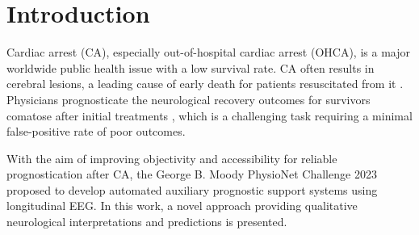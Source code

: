 \section{Introduction}
\label{sec:intro}


Cardiac arrest (CA), especially out-of-hospital cardiac arrest (OHCA), is a major worldwide public health issue with a low survival rate. CA often results in cerebral lesions, a leading cause of early death for patients resuscitated from it \cite{Benghanem_2022_Prog}. Physicians prognosticate the neurological recovery outcomes for survivors comatose after initial treatments \cite{Cronberg_2020_Brain}, which is a challenging task requiring a minimal false-positive rate of poor outcomes.

With the aim of improving objectivity and accessibility for reliable prognostication after CA, the George B. Moody PhysioNet Challenge 2023 \cite{Goldberger2000, 2023Challenge} proposed to develop automated auxiliary prognostic support systems using longitudinal EEG. In this work, a novel approach providing qualitative neurological interpretations and predictions is presented.
